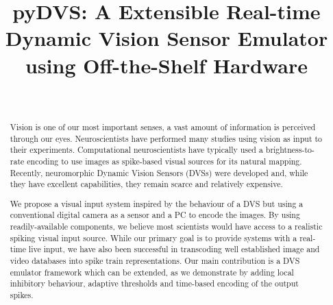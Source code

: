 \documentclass[conference]{IEEEtran}
\begin{document}
\title{pyDVS: A Extensible Real-time Dynamic Vision Sensor Emulator using Off-the-Shelf Hardware}
\author{

\\

}


\maketitle
\begin{abstract}
Vision is one of our most important senses, a vast amount of information is perceived through our eyes. Neuroscientists have performed many studies using vision as input to their experiments. Computational neuroscientists have typically used a brightness-to-rate encoding to use images as spike-based visual sources for its natural mapping. Recently, neuromorphic Dynamic Vision Sensors (DVSs) were developed and, while they have excellent capabilities, they remain scarce and relatively expensive.

We propose a visual input system inspired by the behaviour of a DVS but using a conventional digital camera as a sensor and a PC to encode the images. By using readily-available components, we believe most scientists would have access to a realistic spiking visual input source. While our primary goal is to provide systems with a real-time live input, we have also been successful in transcoding well established image and video databases into spike train representations. Our main contribution is a DVS emulator framework which can be extended, as we demonstrate by adding local inhibitory behaviour, adaptive thresholds and time-based encoding of the output spikes.

\end{abstract}
\IEEEpeerreviewmaketitle
\end{document}
